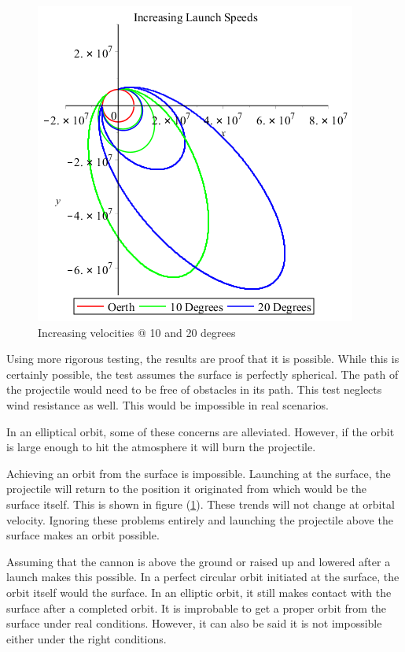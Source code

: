 \documentclass[12pt]{extarticle}
\begin{document}
\begin{figure}
	\begin{center}
		\includegraphics[scale=0.55]{Vescape.png}
		\caption{Increasing velocities @ 10 and 20 degrees}
		\label{fig:img7}
	\end{center}
\end{figure}

Using more rigorous testing, the results are proof that it is possible. While this is certainly possible, the test assumes the surface is perfectly spherical. The path of the projectile would need to be free of obstacles in its path. This test neglects wind resistance as well. This would be impossible in real scenarios.

In an elliptical orbit, some of these concerns are alleviated. However, if the orbit is large enough to hit the atmosphere it will burn the projectile. 

Achieving an orbit from the surface is impossible. Launching at the surface, the projectile will return to the position it originated from which would be the surface itself. This is shown in figure (\ref{fig:img7}). These trends will not change at orbital velocity. Ignoring these problems entirely and launching the projectile above the surface makes an orbit possible. 

Assuming that the cannon is above the ground or raised up and lowered after a launch makes this possible. In a perfect circular orbit initiated at the surface, the orbit itself would the surface. In an elliptic orbit, it still makes contact with the surface after a completed orbit. It is improbable to get a proper orbit from the surface under real conditions. However, it can also be said it is not impossible either under the right conditions.
\end{document}

